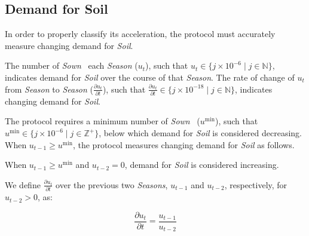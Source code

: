 \documentclass[tikz]{article}
\makeatletter
\newenvironment{keepunit}{%
  \par\penalty0\begingroup
  \edef\keepunitparskip{\the\parskip}%
  \noindent\begin{minipage}[t]{\linewidth}%
  \setlength{\parskip}{\keepunitparskip}%
  \@minipagefalse
}{%
  \end{minipage}\par\endgroup
}
\newcommand{\term}[1]{\textsl{#1}}
\newcommand{\Pinto}{} %
\renewcommand{\Pinto}{\usebox{\cachePinto}}
\makeatother
\begin{document}

\subsection{Demand for Soil}\label{sec:demand-for-soil}

In order to properly classify its acceleration, the protocol must accurately measure changing demand for \term{Soil}.

The number of \term{Sown} \Pinto\ each \term{Season} ($u_{t}$), such that $u_{t} \in \{j \times 10^{-6} \mid j \in \mathbb{N} \}$, indicates demand for \term{Soil} over the course of that \term{Season}. The rate of change of $u_{t}$ from \term{Season} to \term{Season} ($\frac{\partial u_{t}}{\partial t}$), such that $\frac{\partial u_{t}}{\partial t} \in \{j \times 10^{-18} \mid j \in \mathbb{N} \}$, indicates changing demand for \term{Soil}.

The protocol requires a minimum number of \term{Sown} \Pinto\ ($u^{\text{min}}$), such that $u^{\text{min}} \in \{j \times 10^{-6} \mid j \in \mathbb{Z}^{+} \}$, below which demand for \term{Soil} is considered decreasing. When $u_{t-1} \geq u^{\text{min}}$, the protocol measures changing demand for \term{Soil} as follows.

When $u_{t-1} \geq u^{\text{min}}$ and $u_{t-2}=0$, demand for \term{Soil} is considered increasing.

\begin{keepunit}
We define $\frac{\partial u_{t}}{\partial t}$ over the previous two \term{Seasons}, $u_{t-1}$ and $u_{t-2}$, respectively, for $u_{t-2}>0$, as:

    $$
        \frac{\partial u_{t}}{\partial t} = \frac{u_{t-1}}{u_{t-2}}
    $$
\end{keepunit}
\end{document}

